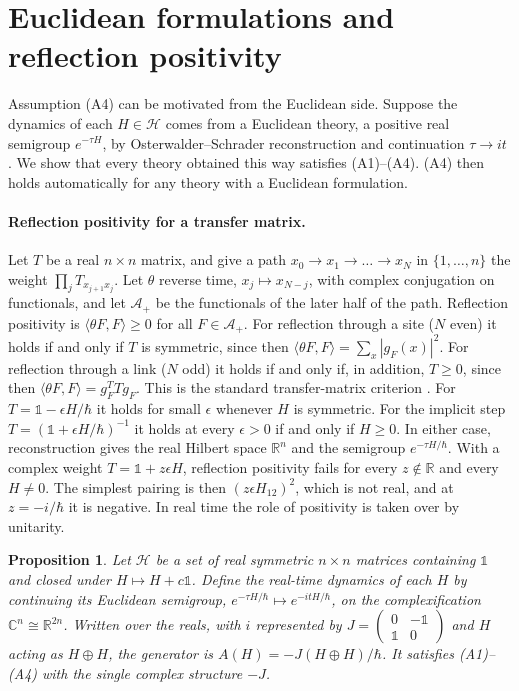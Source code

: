 \documentclass[11pt]{article}
\newtheorem{proposition}[theorem]{Proposition}
\theoremstyle{remark}
\newcommand{\R}{\mathbb{R}}
\newcommand{\C}{\mathbb{C}}
\newcommand{\one}{\mathbb{1}}
\begin{document}
\section{Euclidean formulations and reflection positivity}\label{sec:rp}

Assumption (A4) can be motivated from the Euclidean side. Suppose the dynamics of each $H\in\mathcal{H}$ comes from a Euclidean theory, a positive real semigroup $e^{-\tau H}$, by Osterwalder--Schrader reconstruction and continuation $\tau\to it$ \cite{OS1,OS2}. We show that every theory obtained this way satisfies (A1)--(A4). (A4) then holds automatically for any theory with a Euclidean formulation.

\paragraph{Reflection positivity for a transfer matrix.}
Let $T$ be a real $n\times n$ matrix, and give a path $x_0\to x_1\to\dots\to x_N$ in $\{1,\dots,n\}$ the weight $\prod_j T_{x_{j+1}x_j}$. Let $\theta$ reverse time, $x_j\mapsto x_{N-j}$, with complex conjugation on functionals, and let $\mathcal{A}_+$ be the functionals of the later half of the path. Reflection positivity is $\langle\theta F,F\rangle\ge 0$ for all $F\in\mathcal{A}_+$. For reflection through a site ($N$ even) it holds if and only if $T$ is symmetric, since then $\langle\theta F,F\rangle=\sum_x|g_F(x)|^2$. For reflection through a link ($N$ odd) it holds if and only if, in addition, $T\ge 0$, since then $\langle\theta F,F\rangle=g_F^{T}Tg_F$. This is the standard transfer-matrix criterion \cite{OsterwalderSeiler,FILS,GlimmJaffe}. For $T=\one-\epsilon H/\hbar$ it holds for small $\epsilon$ whenever $H$ is symmetric. For the implicit step $T=(\one+\epsilon H/\hbar)^{-1}$ it holds at every $\epsilon>0$ if and only if $H\ge0$. In either case, reconstruction gives the real Hilbert space $\R^n$ and the semigroup $e^{-\tau H/\hbar}$. With a complex weight $T=\one+z\epsilon H$, reflection positivity fails for every $z\notin\R$ and every $H\neq 0$. The simplest pairing is then $(z\epsilon H_{12})^2$, which is not real, and at $z=-i/\hbar$ it is negative. In real time the role of positivity is taken over by unitarity.

\begin{proposition}\label{prop:rp}
Let $\mathcal{H}$ be a set of real symmetric $n\times n$ matrices containing $\one$ and closed under $H\mapsto H+c\one$. Define the real-time dynamics of each $H$ by continuing its Euclidean semigroup, $e^{-\tau H/\hbar}\mapsto e^{-itH/\hbar}$, on the complexification $\C^n\cong\R^{2n}$. Written over the reals, with $i$ represented by $J=\begin{pmatrix}0&-\one\\ \one&0\end{pmatrix}$ and $H$ acting as $H\oplus H$, the generator is $A(H)=-J(H\oplus H)/\hbar$. It satisfies (A1)--(A4) with the single complex structure $-J$.
\end{proposition}
\end{document}
